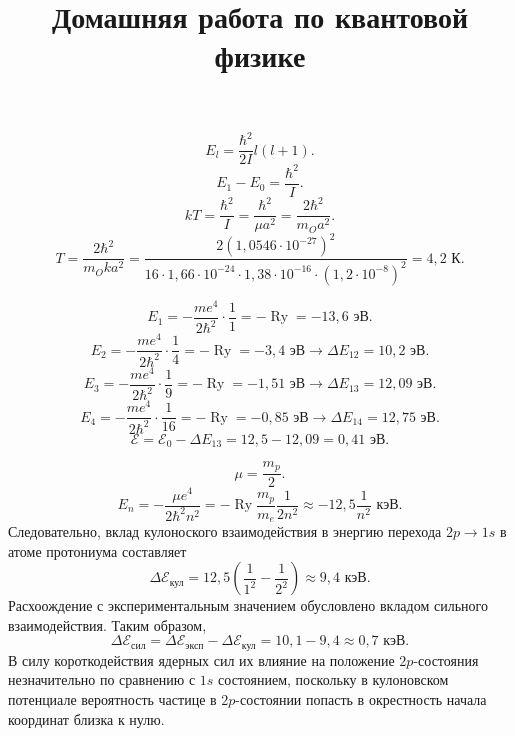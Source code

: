 \documentclass[a4paper]{article}
\title{Домашняя работа по квантовой физике}
\begin{document}
	\maketitle
{}
\begin{sol}
\[
	E_l= \frac{\hbar^2}{2I}l(l+1)
.\] 
\[
E_1 -E_0= \frac{\hbar^2}{I}
.\] 
\[
kT= \frac{\hbar^2}{I}= \frac{\hbar^2}{\mu a^2}= \frac{2 \hbar^2}{m_O
a^2}
.\] 
\[
	T= \frac{2 \hbar^2}{m_O k a^2}= \frac{2 \left( 
	1,0546 \cdot 10^{-27}\right) ^2}{16 \cdot 1,66 \cdot
10^{-24}\cdot 1,38 \cdot 10^{-16}\cdot\left( 1,2 \cdot 10^{-8} \right) ^2}
= 4,2 \text{ К}
.\] 
\end{sol}
\begin{sol}
\[
	E_1= - \frac{m e^4}{2 \hbar^2} \cdot \frac{1}{1}= - \operatorname{Ry}=
	-13,6 \text{ эВ}
.\] 
\[
	E_2= - \frac{m e^4}{2 \hbar^2} \cdot \frac{1}{4}= - \operatorname{Ry}=
	-3,4 \text{ эВ} \to \Delta E_{12}= 10,2 \text{ эВ}
.\] 
\[
	E_3= - \frac{m e^4}{2 \hbar^2} \cdot \frac{1}{9}= - \operatorname{Ry}=
	-1,51 \text{ эВ} \to \Delta E_{13}= 12,09 \text{ эВ}
.\] 
\[
	E_4= - \frac{m e^4}{2 \hbar^2} \cdot \frac{1}{16}= - \operatorname{Ry}=
	-0,85 \text{ эВ} \to \Delta E_{14}= 12,75 \text{ эВ}
.\] 
\[
	\mathcal{E}=\mathcal{E}_0-\Delta E_{13}=
	12,5-12,09=0,41 \text{ эВ}
.\] 
\end{sol}
\begin{sol}
\[
\mu= \frac{m_p}{2}
.\] 
\[
E_n = - \frac{\mu e^4}{2 \hbar^2 n^2}= - \operatorname{Ry} \frac{m_p}{
m_e} \frac{1}{2 n^2} \approx -12,5 \frac{1}{n^2} \text{ кэВ}
.\] 
Следовательно, вклад кулоноского взаимодействия в энергию перехода
$2p \to 1s$ в атоме протониума составляет
\[
	\Delta \mathcal{E}_\text{кул}= 12,5 \left( \frac{1}{1^2}-
	\frac{1}{2^2}\right) \approx 9,4 \text{ кэВ}
.\] 
Расхоождение с экспериментальным значением обусловлено вкладом
сильного взаимодействия. Таким образом,
\[
	\Delta \mathcal{E}_\text{сил} = \Delta \mathcal{E}_\text{эксп}
	- \Delta \mathcal{E}_\text{кул}= 10,1-9,4 \approx 0,7 \text{ кэВ}
.\] 
В силу короткодействия ядерных сил их влияние на положение 
$2p$-состояния незначительно по сравнению с $1s$ состоянием, поскольку
 в кулоновском потенциале вероятность частице в $2p$-состоянии
попасть в окрестность начала координат близка к нулю.
\end{sol}
\end{document}
